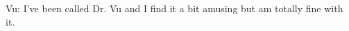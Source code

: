 \documentclass[10pt]{article}
\begin{document}


\begin{tcolorbox}[left=1pt,right=1pt,top=1pt,bottom=1pt]
Vu: I've been called Dr. Vu and I find it a bit amusing but am totally fine with it.
\end{tcolorbox}






\newpage
\end{document}
